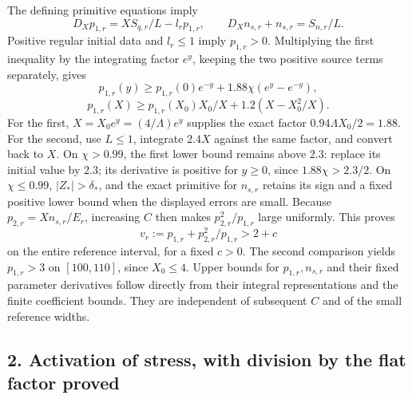 \documentclass[10pt,a4paper]{article}
\begin{document}
The defining primitive equations imply
\[
D_Xp_{1,r}=XS_{q,r}/L-l_rp_{1,r},\qquad
D_Xn_{s,r}+n_{s,r}=S_{n,r}/L.
\]
Positive regular initial data and \(l_r\le1\) imply \(p_{1,r}>0\). Multiplying the first inequality by the integrating factor \(e^y\), keeping the two positive source terms separately, gives
\[
p_{1,r}(y)\ge p_{1,r}(0)e^{-y}
+1.88\chi(e^y-e^{-y}),
\]
\[
p_{1,r}(X)\ge p_{1,r}(X_0)X_0/X
+1.2(X-X_0^2/X).
\]
For the first, \(X=X_0e^y=(4/\Lambda)e^y\) supplies the exact factor \(0.94\Lambda X_0/2=1.88\). For the second, use \(L\le1\), integrate \(2.4X\) against the same factor, and convert back to \(X\). On \(\chi>0.99\), the first lower bound remains above 2.3: replace its initial value by 2.3; its derivative is positive for \(y\ge0\), since \(1.88\chi>2.3/2\). On \(\chi\le0.99\), \(|Z_*|>\delta_*\), and the exact primitive for \(n_{s,r}\) retains its sign and a fixed positive lower bound when the displayed errors are small. Because \(p_{2,r}=Xn_{s,r}/E_r\), increasing \(C\) then makes \(p_{2,r}^2/p_{1,r}\) large uniformly. This proves
\[
v_r:=p_{1,r}+p_{2,r}^2/p_{1,r}>2+c
\]
on the entire reference interval, for a fixed \(c>0\). The second comparison yields \(p_{1,r}>3\) on \([100,110]\), since \(X_0\le4\). Upper bounds for \(p_{1,r},n_{s,r}\) and their fixed parameter derivatives follow directly from their integral representations and the finite coefficient bounds. They are independent of subsequent \(C\) and of the small reference widths.

\subsection{2. Activation of stress, with division by the flat factor proved}
\end{document}

